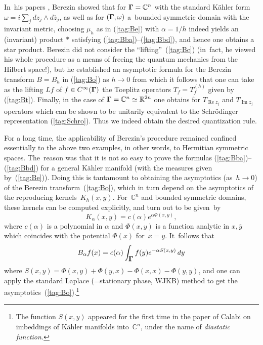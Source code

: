 \documentclass[12pt]{amsart}
\numberwithin{equation}{section}
\theoremstyle{remark}
\newcommand\into{\int_\Omg}
\newcommand\Omg{{\bigam}}   %
\newcommand\RR{\mathbb R}
\newcommand{\CC}{\C}
\newcommand{\bigam}{\mbox{\boldmath $\Gamma$}}
\newcommand{\C}{\mathbb C}
\begin{document}
In~his papers \cite{bib:Berez}, Berezin showed that for $\Omg=\CC^n$ with the
standard K\"ahler form $\omega= i \sum_j dz_j\wedge d\overline z_j$, as
well as for $(\Omg,\omega)$ a~bounded symmetric domain with the invariant
metric, choosing $\mu_h$ as in (\ref{tag:Be}) with $\alpha=1/h$ indeed yields
an (invariant) product $*$ satisfying (\ref{tag:Bba})--(\ref{tag:Bbd}), and
hence one obtains a star product. Berezin did not consider the
``lifting''~(\ref{tag:Bc}) (in~fact, he viewed his whole procedure as a means
of freeing the quantum mechanics from the Hilbert space!), but he established
an asymptotic formula for the Berezin transform $B=B_h$ in (\ref{tag:Bo}) as
$h\to0$ from which it follows that one can take as the lifting $Lf$ of $f\in
C^\infty(\Omg)$ the Toeplitz operators $T_f=T^{(h)}_f$ given by
(\ref{tag:Bt}). Finally, in the case of $\Omg=\CC^n\simeq\RR^{2n}$ one
obtains for $T_{\operatorname{Re}z_j}$ and $T_{\operatorname{Im}z_j}$ operators
which can be shown to be unitarily equivalent to the Schr\"odinger
representation (\ref{tag:Schro}). Thus we indeed obtain the desired
quantization rule.

For a long time, the applicability of Berezin's procedure remained confined
essentially to the above two examples, in other words, to Hermitian symmetric
spaces. The~reason was that it is not so easy to prove the formulas
(\ref{tag:Bba})--(\ref{tag:Bbd}) for a general K\"ahler manifold (with the
measures given  by~(\ref{tag:Be})). Doing this is tantamount to obtaining the
asymptotics (as~$h\to0$) of the Berezin transform~(\ref{tag:Bo}), which in turn
depend on the asymptotics of the reproducing kernels~$K_h(x,y)$. For~$\CC^n$
and bounded symmetric domains, these kernels can be computed explicitly, and
turn out to be given~by \begin{equation}  K_\alpha(x,y) = c(\alpha)
e^{\alpha\Phi(x,y)},  \label{tag:Bf}  \end{equation}  where $c(\alpha)$ is a
polynomial in $\alpha$ and $\Phi(x,y)$ is a function analytic in $x,\overline
y$ which coincides with the potential $\Phi(x)$ for~$x=y$. It~follows that
$$ B_\alpha f(x) = c(\alpha) \into f(y) e^{-\alpha S(x,y)} \, dy  $$
where $S(x,y)=\Phi(x,y)+\Phi(y,x)-\Phi(x,x)-\Phi(y,y)$, and one can apply the
standard Laplace (=stationary phase, WJKB) method to get the
asymptotics~(\ref{tag:Bo}).\footnote{The function $S(x,y)$ appeared for the
first time in the paper of Calabi \cite{bib:+Calabi} on imbeddings of K\"ahler
manifolds into~$\CC^n$, under the name of {\it diastatic function.}}
\end{document}
